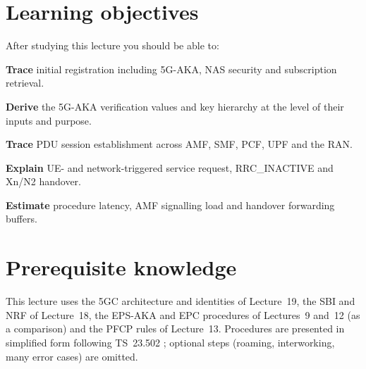 \documentclass[11pt,a4paper]{article}
\begin{document}
\ACNcover

\section{Learning objectives}
After studying this lecture you should be able to:
\begin{objectives}
  \item \textbf{Trace} initial registration including 5G-AKA, NAS security and subscription retrieval.
  \item \textbf{Derive} the 5G-AKA verification values and key hierarchy at the level of their inputs and purpose.
  \item \textbf{Trace} PDU session establishment across AMF, SMF, PCF, UPF and the RAN.
  \item \textbf{Explain} UE- and network-triggered service request, RRC\_INACTIVE and Xn/N2 handover.
  \item \textbf{Estimate} procedure latency, AMF signalling load and handover forwarding buffers.
\end{objectives}

\section{Prerequisite knowledge}
This lecture uses the 5GC architecture and identities of Lecture~19, the SBI and NRF of Lecture~18, the EPS-AKA and EPC
procedures of Lectures~9 and~12 (as a comparison) and the PFCP rules of Lecture~13. Procedures are presented in simplified form
following TS~23.502 \cite{ts23502}; optional steps (roaming, interworking, many error cases) are omitted.
\end{document}

